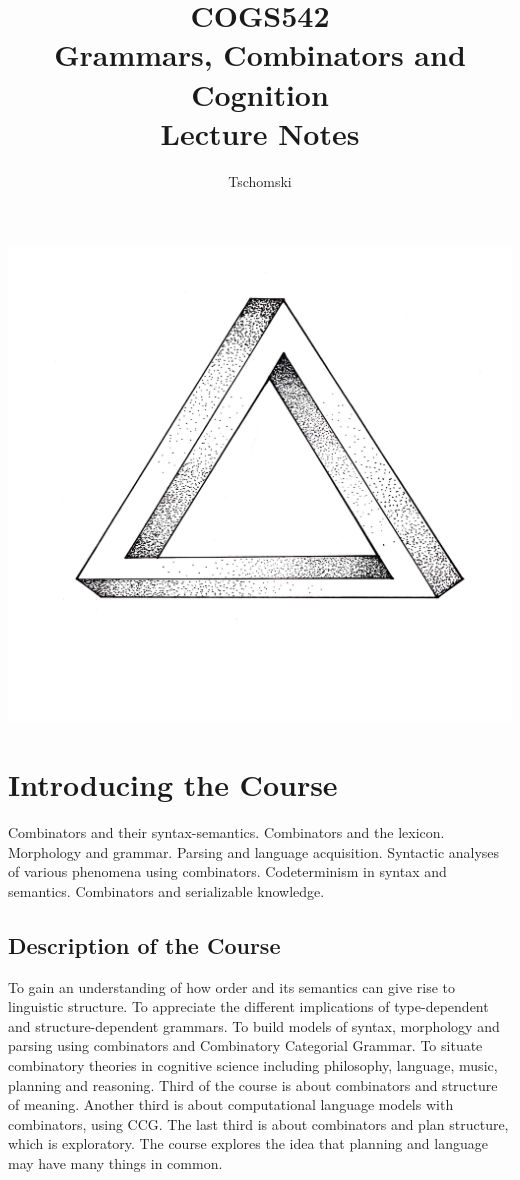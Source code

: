 \documentclass[12pt,a4paper]{article}
\author{Tschomski}
\title{COGS542\\Grammars, Combinators and Cognition\\Lecture Notes}
\begin{document}
\thispagestyle{empty}
\maketitle
\vspace{20pt}
\begin{center}
\includegraphics[scale=0.12]{ucgen}
\end{center}
\justify
\clearpage
\tableofcontents
\clearpage
\section{Introducing the Course}
Combinators and their syntax-semantics. Combinators and the lexicon. Morphology and grammar. Parsing and language acquisition. Syntactic analyses of various phenomena using combinators. Codeterminism in syntax and semantics. Combinators and serializable knowledge.
\subsection{Description of the Course}
To gain an understanding of how order and its semantics can give rise to linguistic structure. To appreciate the different implications of type-dependent and structure-dependent grammars. To build models of syntax, morphology and parsing using combinators and Combinatory Categorial Grammar. To situate combinatory theories in cognitive science including philosophy, language, music, planning and reasoning. Third of the course is about combinators and structure of meaning. Another third is about computational language models with combinators, using CCG. The last third is about combinators and plan structure, which is exploratory. The course explores the idea that planning and language may have many things in common.
\end{document}
